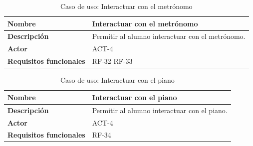 \begin{table}[H]
\centering
\begin{tabularx}{\textwidth}{
  |>{\centering\arraybackslash}l
  |>{\centering\arraybackslash}X|}
\hline
\textbf{Nombre} & {\textbf{Interactuar con el metrónomo}} \\ \hline

\textbf{Descripción} & Permitir al alumno interactuar con el metrónomo. \\ \hline
\textbf{Actor} & ACT-4\\ \hline
\textbf{Requisitos funcionales} & RF-32 RF-33\\ \hline
\end{tabularx}
\caption{Caso de uso: Interactuar con el metrónomo}
\end{table}
\begin{table}[H]
\centering
\begin{tabularx}{\textwidth}{
  |>{\centering\arraybackslash}l
  |>{\centering\arraybackslash}X|}
\hline
\textbf{Nombre} & {\textbf{Interactuar con el piano}} \\ \hline

\textbf{Descripción} & Permitir al alumno interactuar con el piano. \\ \hline
\textbf{Actor} & ACT-4\\ \hline
\textbf{Requisitos funcionales} & RF-34\\ \hline
\end{tabularx}
\caption{Caso de uso: Interactuar con el piano}
\end{table}
